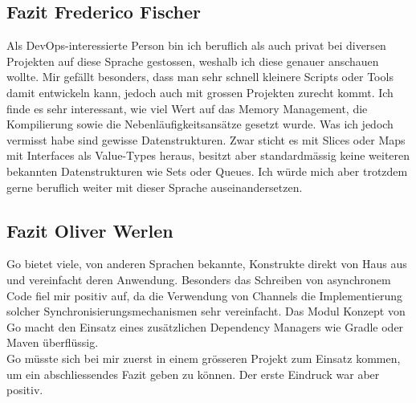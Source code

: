 \documentclass[12pt,titlepage]{article}
\begin{document}
\subsection{Fazit Frederico Fischer}
Als DevOps-interessierte Person bin ich beruflich als auch privat bei diversen Projekten auf diese Sprache gestossen, weshalb ich diese genauer anschauen wollte.
Mir gefällt besonders, dass man sehr schnell kleinere Scripts oder Tools damit entwickeln kann, jedoch auch mit grossen Projekten zurecht kommt.
Ich finde es sehr interessant, wie viel Wert auf das Memory Management, die Kompilierung sowie die Nebenläufigkeitsansätze gesetzt wurde.
Was ich jedoch vermisst habe sind gewisse Datenstrukturen.
Zwar sticht es mit Slices oder Maps mit Interfaces als Value-Types heraus, besitzt aber standardmässig keine weiteren bekannten Datenstrukturen wie Sets oder Queues.
Ich würde mich aber trotzdem gerne beruflich weiter mit dieser Sprache auseinandersetzen.

\subsection{Fazit Oliver Werlen}
Go bietet viele, von anderen Sprachen bekannte, Konstrukte direkt von Haus aus und vereinfacht deren Anwendung.
Besonders das Schreiben von asynchronem Code fiel mir positiv auf, da die Verwendung von Channels die Implementierung solcher Synchronisierungsmechanismen sehr vereinfacht.
Das Modul Konzept von Go macht den Einsatz eines zusätzlichen Dependency Managers wie Gradle oder Maven überflüssig. \\
Go müsste sich bei mir zuerst in einem grösseren Projekt zum Einsatz kommen, um ein abschliessendes Fazit geben zu können.
Der erste Eindruck war aber positiv.

    
\end{document}
